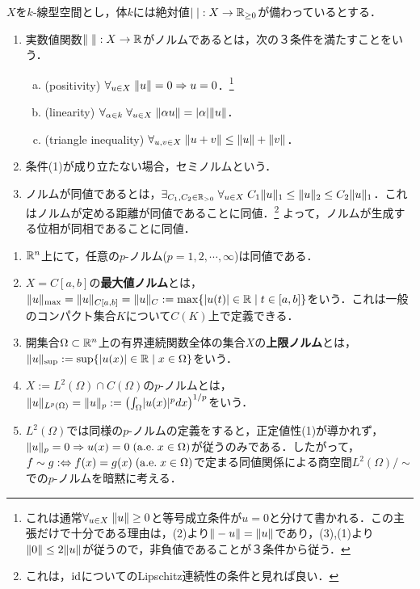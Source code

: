 \documentclass[uplatex, dvipdfmx]{jsreport}
\begin{document}
\begin{definition}
    $X$を$k$-線型空間とし，体$k$には絶対値$\lvert\;\rvert:X\to\mathbb{R}_{\ge 0}$が備わっているとする．
    \begin{enumerate}
        \item 実数値関数$\|\;\|:X\to\mathbb{R}$がノルムであるとは，次の３条件を満たすことをいう．
        \begin{enumerate}[(a)]
            \item (positivity) $\forall_{u\in X}\;\|u\|=0\Rightarrow u=0$．\footnote{これは通常$\forall_{u\in X}\;\|u\|\ge 0$と等号成立条件が$u=0$と分けて書かれる．この主張だけで十分である理由は，(2)より$\|-u\|=\|u\|$であり，(3),(1)より$\|0\|\le 2\|u\|$が従うので，非負値であることが３条件から従う．}
            \item (linearity) $\forall_{\alpha\in k}\;\forall_{u\in X}\;\|\alpha u\|=\lvert\alpha\rvert\|u\|$．
            \item (triangle inequality) $\forall_{u,v\in X}\;\|u+v\|\le\|u\|+\|v\|$．
        \end{enumerate}
        \item 条件(1)が成り立たない場合，セミノルムという．
        \item ノルムが同値であるとは，$\exists_{C_1,C_2\in\mathbb{R}_{>0}}\;\forall_{u\in X}\;C_1\|u\|_1\le\|u\|_2\le C_2\|u\|_1$．これはノルムが定める距離が同値であることに同値．\footnote{これは，$\mathrm{id}$についてのLipschitz連続性の条件と見れば良い．}
        よって，ノルムが生成する位相が同相であることに同値．
    \end{enumerate}
\end{definition}

\begin{example}\mbox{}
    \begin{enumerate}
        \item $\mathbb{R}^n$上にて，任意の$p$-ノルム($p=1,2,\cdots,\infty$)は同値である．
        \item $X=C[a,b]$の\textbf{最大値ノルム}とは，$\|u\|_\mathrm{max}=\|u\|_{C[a,b]}=\|u\|_C:=\max\{\lvert u(t)\rvert\in\mathbb{R}\mid t\in[a,b]\}$をいう．これは一般のコンパクト集合$K$について$C(K)$上で定義できる．
        \item 開集合$\Omega\subset\mathbb{R}^n$上の有界連続関数全体の集合$X$の\textbf{上限ノルム}とは，$\|u\|_{\mathrm{sup}}:=\sup\{\lvert u(x)\rvert\in\mathbb{R}\mid x\in\Omega\}$をいう．
        \item $X:=L^2(\Omega)\cap C(\Omega)$の$p$-ノルムとは，$\|u\|_{L^p(\Omega)}=\|u\|_p:=\left(\int_\Omega\lvert u(x)\rvert^pdx\right)^{1/p}$をいう．
        \item $L^2(\Omega)$では同様の$p$-ノルムの定義をすると，正定値性(1)が導かれず，$\|u\|_p=0\Rightarrow u(x)=0\;(\mathrm{a.e.}\; x\in\Omega)$が従うのみである．したがって，$f\sim g:\Leftrightarrow f(x)=g(x)\;(\mathrm{a.e.}\; x\in\Omega)$で定まる同値関係による商空間$L^2(\Omega)/\sim$での$p$-ノルムを暗黙に考える．
    \end{enumerate}
\end{example}
\end{document}
